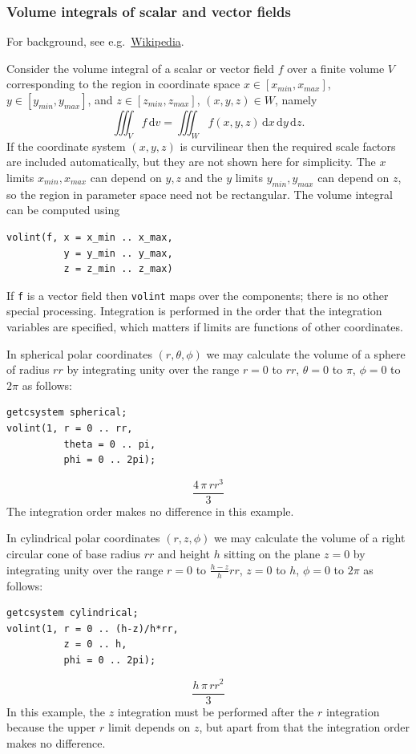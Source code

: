 \subsubsection{Volume integrals of scalar and vector fields}

 
\hypertarget{operator:VOLINT}{}
For background, see e.g.\
\href{https://en.wikipedia.org/wiki/Volume_integral}{Wikipedia}.

Consider the volume integral of a scalar or vector field $f$ over a
finite volume $V$ corresponding to the region in coordinate space
$x \in [x_\mathit{min},x_\mathit{max}]$, $y \in
[y_\mathit{min},y_\mathit{max}]$, and $z \in
[z_\mathit{min},z_\mathit{max}]$, $(x,y,z)\in W$, namely
\[
\iiint_V f\,\mathrm{d}v =
\iiint_W f(x,y,z)\,\mathrm{d}x\,\mathrm{d}y\,\mathrm{d}z.
\]
If the coordinate system $(x,y,z)$ is curvilinear then the required
scale factors are included automatically, but they are not shown here
for simplicity.  The $x$ limits $x_\mathit{min},x_\mathit{max}$ can
depend on $y,z$ and the $y$ limits $y_\mathit{min},y_\mathit{max}$ can
depend on $z$, so the region in parameter space need not be
rectangular.  The volume integral can be computed using
\begin{verbatim}
volint(f, x = x_min .. x_max,
          y = y_min .. y_max,
          z = z_min .. z_max)
\end{verbatim}
If \texttt{f} is a vector field then \texttt{volint} maps over the
components; there is no other special processing.  Integration is
performed in the order that the integration variables are specified,
which matters if limits are functions of other coordinates.

\example{}

In spherical polar coordinates $(r,\theta,\phi)$ we may calculate the
volume of a sphere of radius $\mathit{rr}$ by integrating unity over
the range $r=0$ to $\mathit{rr}$, $\theta=0$ to $\pi$, $\phi=0$ to
$2\pi$ as follows:
\begin{verbatim}
getcsystem spherical;
volint(1, r = 0 .. rr,
          theta = 0 .. pi,
          phi = 0 .. 2pi);
\end{verbatim}
\[ \frac{4\,\pi\,rr^3}{3} \]
The integration order makes no difference in this example.

\example{}

In cylindrical polar coordinates $(r,z,\phi)$ we may calculate the
volume of a right circular cone of base radius $\mathit{rr}$ and
height $h$ sitting on the plane $z=0$ by integrating unity over the
range $r=0$ to $\frac{h-z}{h}\mathit{rr}$, $z=0$ to $h$, $\phi=0$ to
$2\pi$ as follows:
\begin{verbatim}
getcsystem cylindrical;
volint(1, r = 0 .. (h-z)/h*rr,
          z = 0 .. h,
          phi = 0 .. 2pi);
\end{verbatim}
\[ \frac{h\,\pi\,rr^2}{3} \]
In this example, the $z$ integration must be performed after the $r$
integration because the upper $r$ limit depends on $z$, but apart from
that the integration order makes no difference.

